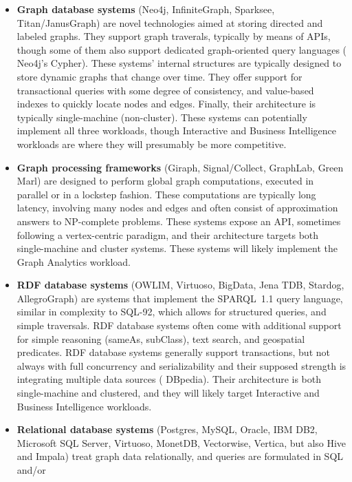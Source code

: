 \begin{itemize}
 \item \textbf{Graph database systems} (\eg Neo4j, InfiniteGraph, Sparksee,
     Titan/JanusGraph) are novel technologies aimed at storing directed and labeled
     graphs. They support graph traverals, typically by means of APIs, though
     some of them also support dedicated graph-oriented query languages (\eg
     Neo4j's Cypher). These systems' internal structures are typically designed
     to store dynamic graphs that change over time.  They offer support for
     transactional queries with some degree of consistency, and value-based
     indexes to quickly locate nodes and edges. Finally, their architecture is
     typically single-machine (non-cluster). These systems can
     potentially implement all three workloads, though Interactive and Business Intelligence
     workloads are where they will presumably be more competitive.
 \item \textbf{Graph processing frameworks} (\eg Giraph, Signal/Collect,
     GraphLab, Green Marl) are designed to perform global graph
     computations, executed in parallel or in a lockstep fashion. These computations are typically
     long latency, involving many nodes and edges and often consist of approximation
     answers to NP-complete problems. These systems expose an API, sometimes following
     a vertex-centric paradigm, and their architecture targets both single-machine and
     cluster systems. These systems will likely implement the Graph Analytics workload.
 \item \textbf{RDF database systems} (\eg OWLIM, Virtuoso, BigData, Jena TDB,
     Stardog, AllegroGraph) are systems that implement the SPARQL~1.1 query
     language, similar in complexity to \mbox{SQL-92}, which allows for structured
     queries, and simple traversals. RDF database systems often come with
     additional support for simple reasoning (sameAs, subClass), text search, and
     geospatial predicates.  RDF database systems generally support
     transactions, but not always with full concurrency and serializability and
     their supposed strength is integrating multiple data sources (\eg
     DBpedia). Their architecture is both single-machine and clustered, and
     they will likely target Interactive and Business Intelligence workloads.
\item \textbf{Relational database systems} (\eg Postgres, MySQL, Oracle, IBM DB2,
     Microsoft SQL Server, Virtuoso, MonetDB, Vectorwise, Vertica, but also Hive and
     Impala) treat graph data relationally, and queries are formulated in SQL and/or

\end{itemize}

